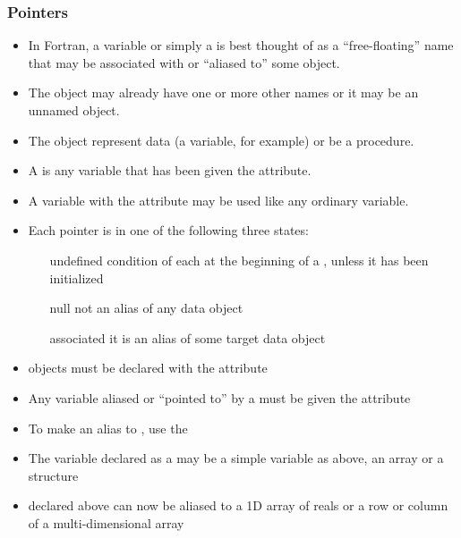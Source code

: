 \documentclass[10pt,t]{beamer}
\begin{document}
\begin{frame}
  \frametitle{\small Pointers}
  \begin{itemize}
    \item In Fortran, a  variable or simply a  is best thought of as a ``free-floating'' name that may be associated with or ``aliased to'' some object.
    \item The object may already have one or more other names or it may be an unnamed object.
    \item The object represent data (a variable, for example) or be a procedure.
    \item A  is any variable that has been given the  attribute.
    \item A variable with the  attribute may be used like any ordinary variable.
      \framebreak
    \item Each pointer is in one of the following three states:
      \begin{itemize}
        \item[undefined] condition of each  at the beginning of a , unless it has been initialized
        \item[null] not an alias of any data object
        \item[associated] it is an alias of some target data object
      \end{itemize}
    \item {} objects must be declared with the  attribute
    \item[] 
    \item Any variable aliased or ``pointed to'' by a  must be given the  attribute
    \item[] 
    \item To make  an alias to , use the 
    \item[] 
      \framebreak
    \item The variable declared as a  may be a simple variable as above, an array or a structure
    \item[] 
    \item {} declared above can now be aliased to a 1D array of reals or a row or column of a multi-dimensional array

\end{itemize}
\end{frame}
\end{document}
